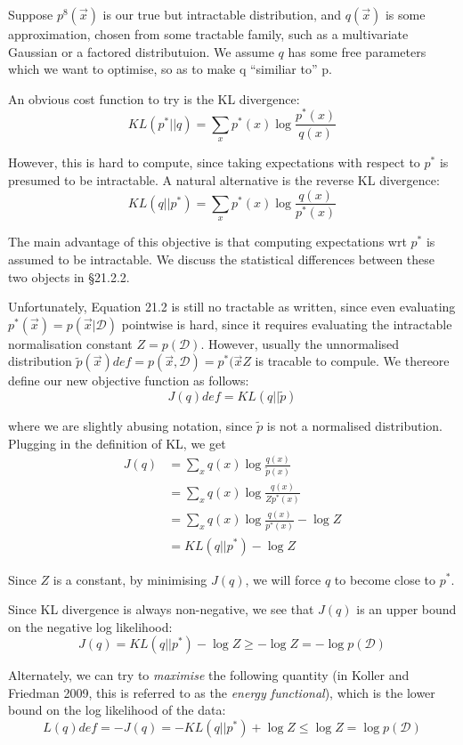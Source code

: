 \documentclass{amsart}
\begin{document}
Suppose $p^{8}(\vec{x})$ is our true but intractable distribution, and $q(\vec{x})$ is some 
approximation, chosen from some tractable family, such as a multivariate Gaussian or a
factored distributuion. We assume $q$ has some free parameters which we want to optimise,
so as to make q ``similiar to'' p.

An obvious cost function to try is the KL divergence:
\[
	KL(p^{*}||q) = \sum_x p^{*}(x) \log{\frac{p^{*}(x)}{q(x)}}
\]

However, this is hard to compute, since taking expectations with respect to $p^{*}$ is
presumed to be intractable. A natural alternative is the reverse KL divergence:
\[
	KL(q||p^{*}) = \sum_x p^{*}(x) \log{\frac{q(x)}{p^{*}(x)}}
\]

The main advantage of this objective is that computing expectations wrt $p^{*}$ is assumed
to be intractable. We discuss the statistical differences between these two objects in
\S 21.2.2. %

Unfortunately, Equation 21.2 is still no tractable as written, since even evaluating
$p^{*}(\vec{x}) = p(\vec{x} | \mathcal{D})$ pointwise is hard, since it requires evaluating
the intractable normalisation constant $Z=p(\mathcal{D})$. However, usually the unnormalised
distribution $\tilde{p}(\vec{x}) def = p(\vec{x}, \mathcal{D}) = p^{*}(\vec{x} Z$ is
tracable to compule. We thereore define our new objective function as follows:
\[
J(q) def = KL(q||\tilde{p})
\]

where we are slightly abusing notation, since $\tilde{p}$ is not a normalised distribution.
Plugging in the definition of KL, we get
\begin{align*}
J(q) &= \sum_x q(x) \log{\frac{q(x)}{\tilde{p}(x)}} \\
&= \sum_x q(x) \log{\frac{q(x)}{Z p^{*}(x)}} \\
&= \sum_x q(x) \log{\frac{q(x)}{p^{*}(x)}} - \log{Z} \\
&= KL(q || p^{*}) - \log{Z}
\end{align*}

Since $Z$ is a constant, by minimising $J(q)$, we will force $q$ to become close to
$p^{*}$.

Since KL divergence is always non-negative, we see that $J(q)$ is an upper bound on the
negative log likelihood:
\[
J(q) = KL(q||p^{*}) - \log{Z} \geq -\log{Z} = -\log{p(\mathcal{D})}
\]

Alternately, we can try to \emph{maximise} the following quantity (in Koller and Friedman
2009, this is referred to as the \emph{energy functional}), which is the lower bound on
the log likelihood of the data:
\[
L(q) def = -J(q) = -KL(q||p^{*}) + \log{Z} \leq \log{Z} = \log{p(\mathcal{D})}
\]
\end{document}

